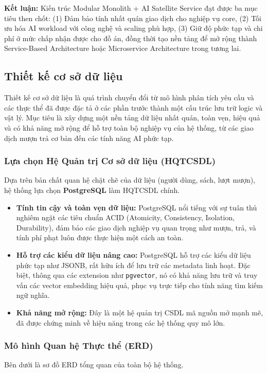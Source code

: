 \textbf{Kết luận:} Kiến trúc Modular Monolith + AI Satellite Service đạt được ba mục tiêu then chốt: (1) Đảm bảo tính nhất quán giao dịch cho nghiệp vụ core, (2) Tối ưu hóa AI workload với công nghệ và scaling phù hợp, (3) Giữ độ phức tạp và chi phí ở mức chấp nhận được cho đồ án, đồng thời tạo nền tảng để mở rộng thành Service-Based Architecture hoặc Microservice Architecture trong tương lai.


\subsection{Thiết kế cơ sở dữ liệu}
\label{subsec:database-design}

Thiết kế cơ sở dữ liệu là quá trình chuyển đổi từ mô hình phân tích yêu cầu và các thực thể đã được đặc tả ở các phần trước thành một cấu trúc lưu trữ logic và vật lý. Mục tiêu là xây dựng một nền tảng dữ liệu nhất quán, toàn vẹn, hiệu quả và có khả năng mở rộng để hỗ trợ toàn bộ nghiệp vụ của hệ thống, từ các giao dịch mượn trả cơ bản đến các tính năng AI phức tạp.

\subsubsection{Lựa chọn Hệ Quản trị Cơ sở dữ liệu (HQTCSDL)}
Dựa trên bản chất quan hệ chặt chẽ của dữ liệu (người dùng, sách, lượt mượn), hệ thống lựa chọn \textbf{PostgreSQL} làm HQTCSDL chính.
\begin{itemize}
 \item \textbf{Tính tin cậy và toàn vẹn dữ liệu:} PostgreSQL nổi tiếng với sự tuân thủ nghiêm ngặt các tiêu chuẩn ACID (Atomicity, Consistency, Isolation, Durability), đảm bảo các giao dịch nghiệp vụ quan trọng như mượn, trả, và tính phí phạt luôn được thực hiện một cách an toàn.
 \item \textbf{Hỗ trợ các kiểu dữ liệu nâng cao:} PostgreSQL hỗ trợ các kiểu dữ liệu phức tạp như JSONB, rất hữu ích để lưu trữ các metadata linh hoạt. Đặc biệt, thông qua các extension như \texttt{pgvector}, nó có khả năng lưu trữ và truy vấn các vector embedding hiệu quả, phục vụ trực tiếp cho tính năng tìm kiếm ngữ nghĩa.
 \item \textbf{Khả năng mở rộng:} Đây là một hệ quản trị CSDL mã nguồn mở mạnh mẽ, đã được chứng minh về hiệu năng trong các hệ thống quy mô lớn.
\end{itemize}

\subsubsection{Mô hình Quan hệ Thực thể (ERD)}
Bên dưới là sơ đồ ERD tổng quan của toàn bộ hệ thống.


